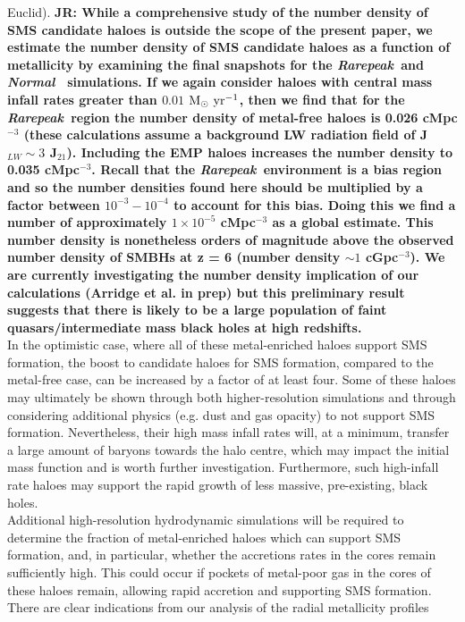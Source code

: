 \documentclass[twocolumn,iop,revtex4]{openjournal}
\newcommand{\msolaryrc} {$\rm{M_{\odot}~yr^{-1}}$}
\newcommand{\rarepeak} {\textit{Rarepeak~}}
\newcommand{\normal} {\textit{Normal~}}
\def\jr#1{{\color{blue} \bf JR:  #1}}
\begin{document}
Euclid). \jr{While a comprehensive study of the number density of SMS candidate haloes is outside the
scope of the present paper, we estimate the number density of SMS candidate
haloes as a function of metallicity by examining the final snapshots for the \rarepeak and \normal
simulations. If we again consider haloes with central mass infall rates greater than $0.01$
\msolaryrc, then we find that for the \rarepeak region the number density of metal-free haloes
is 0.026 cMpc$^{-3}$ (these calculations assume a background LW radiation field of J$_{LW} \sim 3$ J$_{21}$). Including the EMP haloes increases the number density to 0.035 cMpc$^{-3}$.  Recall that the \rarepeak environment is a bias region and so the number densities found here should be multiplied by a factor between $10^{-3} - 10^{-4}$ to account for this bias. Doing this we find a number of approximately $1 \times 10^{-5}$ cMpc$^{-3}$ as a global estimate. This  
number density is nonetheless orders of magnitude above the observed number density of
SMBHs at z = 6 (number density $\sim 1$ cGpc$^{-3}$). We are currently investigating the number
density implication of our calculations (Arridge et al. in prep) but this preliminary result
suggests that there is likely to be a large population of faint quasars/intermediate mass
black holes at high redshifts.}
\\
\indent In the optimistic case, where all of these metal-enriched haloes support SMS formation, the
boost to
candidate haloes for SMS formation, compared to the metal-free case, can be increased by a factor of
at least four. Some of these haloes may ultimately be shown through both  higher-resolution simulations
and through considering additional physics (e.g. dust and gas opacity) 
to not support SMS formation. Nevertheless, their high mass infall rates will, at a minimum, transfer
a large amount of baryons towards the halo centre, which may impact the initial mass function and
is worth further investigation. Furthermore, such high-infall rate haloes may support the rapid
growth of less massive, pre-existing, black holes. \\
\indent Additional high-resolution hydrodynamic simulations will be required to
determine the fraction of metal-enriched haloes which can support SMS formation, and, in particular,
whether the accretions rates in the cores remain sufficiently high.  This could occur if pockets
of metal-poor gas in the cores of these haloes remain, allowing rapid accretion and supporting SMS
formation. There are clear indications from our analysis of the radial metallicity profiles
\end{document}
